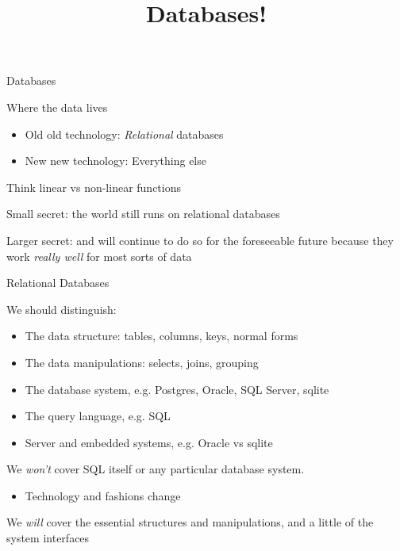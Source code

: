 \documentclass{hertieteaching}
\title{Databases!}
\begin{document}
{
  \begin{frame}\maketitle\end{frame}
}
\addtocounter{page}{-1}

\begin{frame}{Databases}

Where the data lives 
\begin{itemize}
  \item Old old technology: \textit{Relational} databases
  \item New new technology: Everything else
\end{itemize}
Think linear vs non-linear functions

\pause
\bigskip
Small secret: the world still runs on relational databases

Larger secret: and will continue to do so for the foreseeable future because they work \textit{really well} for most sorts of data

\end{frame}

\begin{frame}{Relational Databases}

We should distinguish:
\begin{itemize}
  \item The data structure: tables, columns, keys, normal forms
  \item The data manipulations: selects, joins, grouping
  \item The database system, e.g. \textsf{Postgres}, \textsf{Oracle}, \textsf{SQL Server}, \textsf{sqlite}
  \item The query language, e.g. \textsf{SQL}
  \item Server and embedded systems, e.g. \textsf{Oracle} vs \textsf{sqlite}
\end{itemize}

We \textit{won't} cover \textsf{SQL} itself or any particular database system.
\begin{itemize}
  \item Technology and fashions change
\end{itemize}


We \textit{will} cover the essential structures and manipulations, and a little of the system interfaces

\end{frame}
\end{document}
